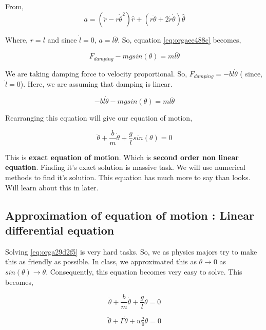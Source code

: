 \documentclass[11pt,a4paper]{article}
\begin{document}
From,
\begin{equation*}
\label{eq:orgde960f2}
a = (\ddot{r}-r\dot{\theta}^{2})\hat{r} + (r \ddot{\theta}+2\dot{r}\dot{\theta})\hat{\theta}
\end{equation*}

Where,  \(r=l\) and since \(\dot{l}=0\), \(a=l\ddot{\theta}\). So, equation \ref{eq:orgaee488c} becomes,

\begin{equation*}
\label{eq:org11b111a}
F_{damping}-mgsin(\theta)=ml\ddot{\theta}
\end{equation*}

We are taking damping force to velocity proportional. So, \(F_{damping}=-bl\dot{\theta}\) ( since, \(\dot{l}=0\)). Here, we are assuming that damping is linear. 

\begin{equation*}
\label{eq:org1eb51a8}
-bl\dot{\theta}-mgsin(\theta)=ml\ddot{\theta}
\end{equation*}


Rearranging this equation will give our equation of motion,

\begin{equation}
\label{eq:orga29d2f5}
\ddot{\theta}+\frac{b}{m}\dot{\theta}+\frac{g}{l}sin(\theta)=0
\end{equation}

This is \textbf{exact equation of motion}. Which is \textbf{second order non linear equation}. Finding it's exact solution is massive task. We will use numerical methods to find it's solution. This equation has much more to say than looks. Will learn about this in later.

\subsection{Approximation of equation of motion : Linear differential equation}
\label{sec:org6520315}

Solving \ref{eq:orga29d2f5} is very hard tasks. So, we as physics majors try to make this as friendly as possible. In class, we approximated this as \(\theta \to 0\) as \(sin(\theta) \to \theta\). Consequently, this equation becomes very easy to solve. This becomes,

\begin{equation}
\label{eq:orgc9ebe6e}
\ddot{\theta}+\frac{b}{m}\dot{\theta}+\frac{g}{l}\theta=0
\end{equation}

\begin{equation}
\label{eq:org1446dde}
\ddot{\theta}+\Gamma\dot{\theta}+w_{0}^{2}\theta=0
\end{equation}
\end{document}
